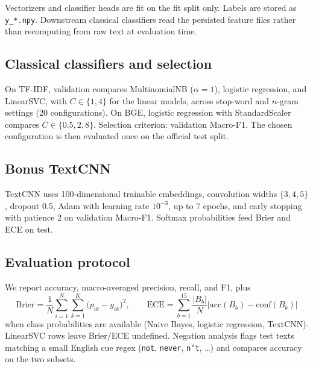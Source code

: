 Vectorizers and classifier heads are fit on the fit split only. Labels are stored as \texttt{y\_*.npy}. Downstream classical classifiers read the persisted feature files rather than recomputing from raw text at evaluation time.

\subsection{Classical classifiers and selection}

On TF-IDF, validation compares MultinomialNB ($\alpha=1$), logistic regression, and LinearSVC, with $C\in\{1,4\}$ for the linear models, across stop-word and $n$-gram settings (20 configurations). On BGE, logistic regression with StandardScaler compares $C\in\{0.5,2,8\}$. Selection criterion: validation Macro-F1. The chosen configuration is then evaluated once on the official test split.

\subsection{Bonus TextCNN}

TextCNN uses 100-dimensional trainable embeddings, convolution widths $\{3,4,5\}$, dropout 0.5, Adam with learning rate $10^{-3}$, up to 7 epochs, and early stopping with patience 2 on validation Macro-F1. Softmax probabilities feed Brier and ECE on test.

\subsection{Evaluation protocol}

We report accuracy, macro-averaged precision, recall, and F1, plus
\begin{equation*}
\mathrm{Brier}
  = \frac{1}{N}\sum_{i=1}^{N}\sum_{k=1}^{K}\bigl(p_{ik}-y_{ik}\bigr)^{2},
\qquad
\mathrm{ECE}
  = \sum_{b=1}^{15}\frac{|B_b|}{N}\bigl|\mathrm{acc}(B_b)-\mathrm{conf}(B_b)\bigr|
\end{equation*}
when class probabilities are available (Naive Bayes, logistic regression, TextCNN). LinearSVC rows leave Brier/ECE undefined. Negation analysis flags test texts matching a small English cue regex (\texttt{not}, \texttt{never}, \texttt{n't}, \ldots) and compares accuracy on the two subsets.
